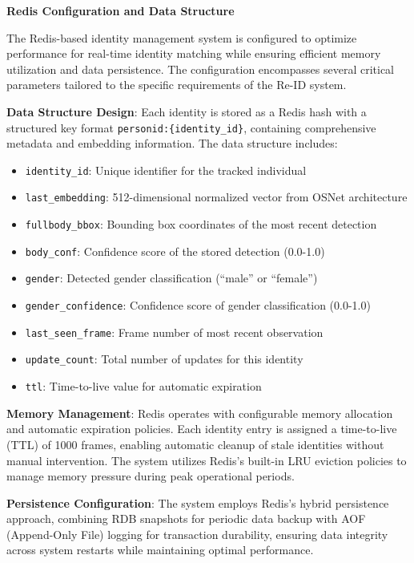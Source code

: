 \textbf{Redis Configuration and Data Structure}

The Redis-based identity management system is configured to optimize performance for real-time identity matching while ensuring efficient memory utilization and data persistence. The configuration encompasses several critical parameters tailored to the specific requirements of the Re-ID system.

\textbf{Data Structure Design}: Each identity is stored as a Redis hash with a structured key format \texttt{personid:\{identity\_id\}}, containing comprehensive metadata and embedding information. The data structure includes:

\begin{itemize}
   \item \texttt{identity\_id}: Unique identifier for the tracked individual
   \item \texttt{last\_embedding}: 512-dimensional normalized vector from OSNet architecture 
   \item \texttt{fullbody\_bbox}: Bounding box coordinates of the most recent detection
   \item \texttt{body\_conf}: Confidence score of the stored detection (0.0-1.0)
   \item \texttt{gender}: Detected gender classification (``male'' or ``female'')
   \item \texttt{gender\_confidence}: Confidence score of gender classification (0.0-1.0)
   \item \texttt{last\_seen\_frame}: Frame number of most recent observation
   \item \texttt{update\_count}: Total number of updates for this identity
   \item \texttt{ttl}: Time-to-live value for automatic expiration
\end{itemize}

\textbf{Memory Management}: Redis operates with configurable memory allocation and automatic expiration policies. Each identity entry is assigned a time-to-live (TTL) of 1000 frames, enabling automatic cleanup of stale identities without manual intervention. The system utilizes Redis's built-in LRU eviction policies to manage memory pressure during peak operational periods.

\textbf{Persistence Configuration}: The system employs Redis's hybrid persistence approach, combining RDB snapshots for periodic data backup with AOF (Append-Only File) logging for transaction durability, ensuring data integrity across system restarts while maintaining optimal performance.

